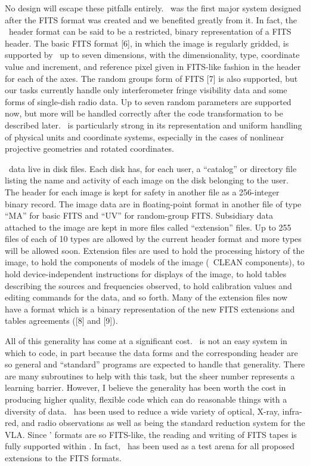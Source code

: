     No design will escape these pitfalls entirely.  \AIPS\ was the
first major system designed after the FITS format was created and we
benefited greatly from it.  In fact, the \AIPS\ header format can
be said to be a restricted, binary representation of a FITS header.
The basic FITS format [6], in which the image is regularly gridded,
is supported by \AIPS\ up to seven dimensions, with the dimensionality,
type,  coordinate value and increment, and reference pixel given in
FITS-like fashion in the header for each of the axes.  The random
groups form of FITS [7] is also supported, but our tasks currently
handle only interferometer fringe visibility data and some forms of
single-dish radio data.   Up to seven random parameters
are supported now, but more will be handled correctly after the code
transformation to be described later.  \AIPS\ is particularly strong
in its representation and uniform handling of physical units and
coordinate systems, especially in the cases of nonlinear projective
geometries and rotated coordinates.

     \Aips\ data live in disk files.  Each disk has, for each user,
a ``catalog'' or directory file listing the name and activity of each
image on the disk belonging to the user.  The header for each image
is kept for safety in another file as a 256-integer binary record.  The
image data are in floating-point format in another file of type
``MA'' for basic FITS and ``UV'' for random-group \hbox{FITS}.  Subsidiary
data attached to the image are kept in more files called ``extension''
files.  Up to 255 files of each of 10 types are allowed by the current
header format and more types will be allowed soon.  Extension files
are used to hold the processing history of the image, to hold the
components of models of the image (\eg\ CLEAN components), to hold
device-independent instructions for displays of the image, to hold
tables describing the sources and frequencies observed, to hold
calibration values and editing commands for the data, and so forth.
Many of the extension files now have a format which is a binary
representation of the new FITS extensions and tables agreements
([8] and [9]).

     All of this generality has come at a significant cost.  \AIPS\ is
not an easy system in which to code, in part because the data forms
and the corresponding header are so general and ``standard'' programs
are expected to handle that generality.  There are many subroutines
to help with this task, but the sheer number represents a learning
barrier.  However, I believe the generality has
been worth the cost in producing higher quality, flexible code which
can do reasonable things with a diversity of data.  \AIPS\ has been
used to reduce a wide variety of optical, X-ray, infra-red, and radio
observations as well as being the standard reduction system for the
VLA.  Since \AIPS' formats are so FITS-like, the reading and writing
of FITS tapes is fully supported within \AIPS.  In fact, \AIPS\ has
been used as a test arena for all proposed extensions to the FITS
formats.

